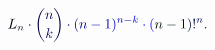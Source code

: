 \documentclass[12pt]{article}
\begin{document}
\makeatletter
\renewcommand*{\@textcolor}[3]{%
  \protect\leavevmode
  \begingroup
    \color#1{#2}#3%
  \endgroup
}
\makeatother
\begin{displaymath}
\mathcolor[RGB]{0,0,15}{L} _ { \mathcolor[RGB]{0,0,30}{n} } \mathcolor[RGB]{0,0,45}{\cdot} \mathcolor[RGB]{0,0,60}{\binom { \mathcolor[RGB]{0,0,75}{n} } { \mathcolor[RGB]{0,0,90}{k} } } \mathcolor[RGB]{0,0,105}{\cdot} \mathcolor[RGB]{0,0,120}{(} \mathcolor[RGB]{0,0,135}{n} \mathcolor[RGB]{0,0,150}{-} \mathcolor[RGB]{0,0,165}{1} \mathcolor[RGB]{0,0,180}{)} ^ { \mathcolor[RGB]{0,0,195}{n} \mathcolor[RGB]{0,0,210}{-} \mathcolor[RGB]{0,0,225}{k} } \mathcolor[RGB]{0,0,240}{\cdot} \mathcolor[RGB]{0,0,255}{(} \mathcolor[RGB]{0,15,0}{n} \mathcolor[RGB]{0,15,15}{-} \mathcolor[RGB]{0,15,30}{1} \mathcolor[RGB]{0,15,45}{)} \mathcolor[RGB]{0,15,60}{!} ^ { \mathcolor[RGB]{0,15,75}{n} } \mathcolor[RGB]{0,15,90}{.}
\end{displaymath}
\end{document}

